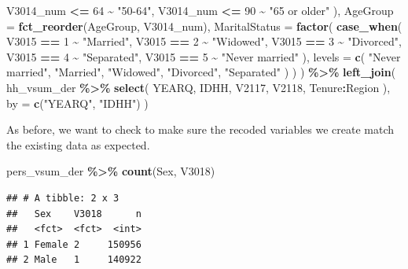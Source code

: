 \documentclass[
]{krantz}
\makeatletter
\newenvironment{Shaded}{\begin{snugshade}}{\end{snugshade}}
\newcommand{\AttributeTok}[1]{\textcolor[rgb]{0.27,0.27,0.27}{#1}}
\newcommand{\DecValTok}[1]{\textcolor[rgb]{0.06,0.06,0.06}{#1}}
\newcommand{\FunctionTok}[1]{\textcolor[rgb]{0.27,0.27,0.27}{\textbf{#1}}}
\newcommand{\NormalTok}[1]{#1}
\newcommand{\SpecialCharTok}[1]{\textcolor[rgb]{0.43,0.43,0.43}{\textbf{#1}}}
\newcommand{\StringTok}[1]{\textcolor[rgb]{0.5,0.5,0.5}{#1}}
\newenvironment{kframe}{%
\medskip{}
\setlength{\fboxsep}{.8em}
 \def\at@end@of@kframe{}%
 \ifinner\ifhmode%
  \def\at@end@of@kframe{\end{minipage}}%
  \begin{minipage}{\columnwidth}%
 \fi\fi%
 \def\FrameCommand##1{\hskip\@totalleftmargin \hskip-\fboxsep
 \colorbox{shadecolor}{##1}\hskip-\fboxsep
     \hskip-\linewidth \hskip-\@totalleftmargin \hskip\columnwidth}%
 \MakeFramed {\advance\hsize-\width
   \@totalleftmargin\z@ \linewidth\hsize
   \@setminipage}}%
 {\par\unskip\endMakeFramed%
 \at@end@of@kframe}
\renewenvironment{Shaded}{\begin{kframe}}{\end{kframe}}
\makeatother
\begin{document}
\begin{Shaded}
\begin{Highlighting}[]
\NormalTok{      V3014\_num }\SpecialCharTok{\textless{}=} \DecValTok{64} \SpecialCharTok{\textasciitilde{}} \StringTok{"50{-}64"}\NormalTok{,}
\NormalTok{      V3014\_num }\SpecialCharTok{\textless{}=} \DecValTok{90} \SpecialCharTok{\textasciitilde{}} \StringTok{"65 or older"}
\NormalTok{    ),}
    \AttributeTok{AgeGroup =} \FunctionTok{fct\_reorder}\NormalTok{(AgeGroup, V3014\_num),}
    \AttributeTok{MaritalStatus =} \FunctionTok{factor}\NormalTok{(}
      \FunctionTok{case\_when}\NormalTok{(}
\NormalTok{        V3015 }\SpecialCharTok{==} \DecValTok{1} \SpecialCharTok{\textasciitilde{}} \StringTok{"Married"}\NormalTok{,}
\NormalTok{        V3015 }\SpecialCharTok{==} \DecValTok{2} \SpecialCharTok{\textasciitilde{}} \StringTok{"Widowed"}\NormalTok{,}
\NormalTok{        V3015 }\SpecialCharTok{==} \DecValTok{3} \SpecialCharTok{\textasciitilde{}} \StringTok{"Divorced"}\NormalTok{,}
\NormalTok{        V3015 }\SpecialCharTok{==} \DecValTok{4} \SpecialCharTok{\textasciitilde{}} \StringTok{"Separated"}\NormalTok{,}
\NormalTok{        V3015 }\SpecialCharTok{==} \DecValTok{5} \SpecialCharTok{\textasciitilde{}} \StringTok{"Never married"}
\NormalTok{      ),}
      \AttributeTok{levels =} \FunctionTok{c}\NormalTok{(}
        \StringTok{"Never married"}\NormalTok{, }\StringTok{"Married"}\NormalTok{,}
        \StringTok{"Widowed"}\NormalTok{, }\StringTok{"Divorced"}\NormalTok{,}
        \StringTok{"Separated"}
\NormalTok{      )}
\NormalTok{    )}
\NormalTok{  ) }\SpecialCharTok{\%\textgreater{}\%}
  \FunctionTok{left\_join}\NormalTok{(}
\NormalTok{    hh\_vsum\_der }\SpecialCharTok{\%\textgreater{}\%} \FunctionTok{select}\NormalTok{(}
\NormalTok{      YEARQ, IDHH,}
\NormalTok{      V2117, V2118, Tenure}\SpecialCharTok{:}\NormalTok{Region}
\NormalTok{    ),}
    \AttributeTok{by =} \FunctionTok{c}\NormalTok{(}\StringTok{"YEARQ"}\NormalTok{, }\StringTok{"IDHH"}\NormalTok{)}
\NormalTok{  )}
\end{Highlighting}
\end{Shaded}

As before, we want to check to make sure the recoded variables we create match the existing data as expected.

\begin{Shaded}
\begin{Highlighting}[]
\NormalTok{pers\_vsum\_der }\SpecialCharTok{\%\textgreater{}\%} \FunctionTok{count}\NormalTok{(Sex, V3018)}
\end{Highlighting}
\end{Shaded}

\begin{verbatim}
## # A tibble: 2 x 3
##   Sex    V3018      n
##   <fct>  <fct>  <int>
## 1 Female 2     150956
## 2 Male   1     140922
\end{verbatim}
\end{document}
